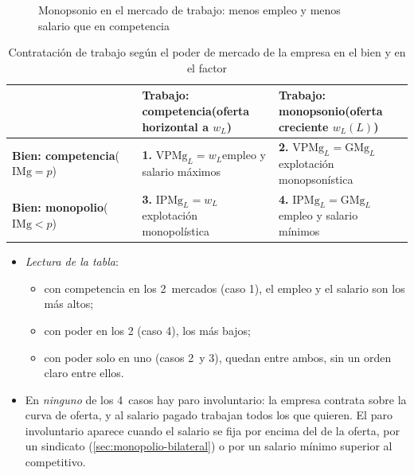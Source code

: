 \documentclass[11pt]{article}
\begin{document}
\begin{figure}[H]
\centering
\caption{Monopsonio en el mercado de trabajo: menos empleo y menos salario que en competencia}\label{fig:monopsonio}
\end{figure}

\begin{table}[H]
\centering
\caption{Contratación de trabajo según el poder de mercado de la empresa en el bien y en el factor}\label{tab:cuatro-casos}
\renewcommand{\arraystretch}{1.3}
\begin{tabular}{>{\centering\arraybackslash}m{}>{\centering\arraybackslash}m{}>{\centering\arraybackslash}m{}}
\toprule
\rowcolor{tceeazulpalido} & \textbf{Trabajo: competencia}\newline (oferta horizontal a $w_L$) & \textbf{Trabajo: monopsonio}\newline (oferta creciente $w_L(L)$)\\
\midrule
\textbf{Bien: competencia}\newline ($\mathrm{IMg}=p$) & \cellcolor{tceesalvia}\textcolor{tceeverde}{\textbf{1.} $\mathrm{VPMg}_L=w_L$}\newline empleo y salario máximos & \textcolor{tceeazul}{\textbf{2.} $\mathrm{VPMg}_L=\mathrm{GMg}_L$}\newline explotación monopsonística\\
\textbf{Bien: monopolio}\newline ($\mathrm{IMg}<p$) & \textcolor{tceedorado}{\textbf{3.} $\mathrm{IPMg}_L=w_L$}\newline explotación monopolística & \textcolor{tceerojo}{\textbf{4.} $\mathrm{IPMg}_L=\mathrm{GMg}_L$}\newline empleo y salario mínimos\\
\bottomrule
\end{tabular}
\end{table}

\begin{itemize}
\item \emph{Lectura de la tabla}:
  \begin{itemize}
  \item con competencia en los 2~mercados (caso 1), el empleo y el salario son los más altos;
  \item con poder en los 2 (caso 4), los más bajos;
  \item con poder solo en uno (casos 2~y 3), quedan entre ambos, sin un orden claro entre ellos.
  \end{itemize}
\item En \emph{ninguno} de los 4~casos hay paro involuntario: la empresa contrata sobre la curva de oferta, y al salario pagado trabajan todos los que quieren. El paro involuntario aparece cuando el salario se fija por encima del de la oferta, por un sindicato (\ref{sec:monopolio-bilateral}) o por un salario mínimo superior al competitivo.
\end{itemize}
\end{document}
